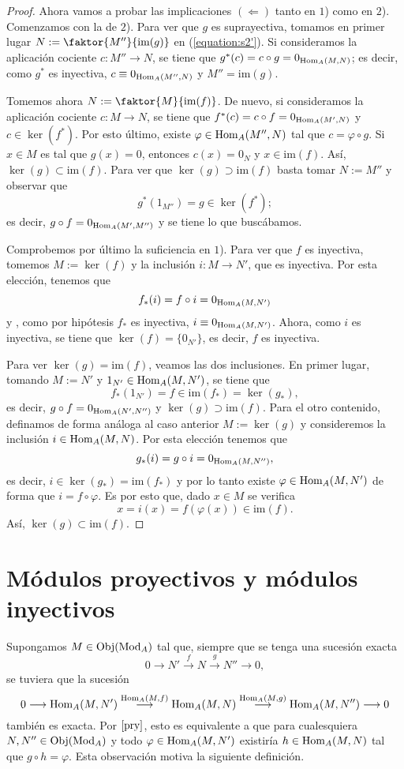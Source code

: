 \documentclass[../main.tex]{subfiles}
\begin{document}
\begin{proof}
Ahora vamos a probar las implicaciones $(\Leftarrow)$ tanto en $1$) como en $2$). Comenzamos con la de $2$). Para ver que $g$ es suprayectiva, tomamos en primer lugar $N:=\faktor{M''}{\text{im}(g)}$ en (\ref{equation:s2'}). Si consideramos la aplicación cociente $c:M''\longrightarrow N$, se tiene que $g^*(c)=c\circ g=0_{\text{Hom}_A(M,N)}$; es decir, como $g^*$ es inyectiva, $c\equiv 0_{\text{Hom}_A(M'',N)}$ y $M''=\text{im}(g)$.

Tomemos ahora $N:=\faktor{M}{\text{im}(f)}$. De nuevo, si consideramos la aplicación cociente $c:M\longrightarrow N$, se tiene que $f^*(c)=c\circ f=0_{\text{Hom}_A(M',N)}$ y $c\in\ker(f^*)$. Por esto último, existe $\varphi\in\text{Hom}_A(M'',N)$ tal que $c=\varphi\circ g$. Si $x\in M$ es tal que $g(x)=0$, entonces $c(x)=0_N$ y $x\in\text{im}(f)$. Así, $\ker(g)\subset\text{im}(f)$. Para ver que $\ker(g)\supset\text{im}(f)$ basta tomar $N:=M''$ y observar que $$g^*(1_{M''})=g\in\ker(f^*);$$ es decir, $g\circ f=0_{\text{Hom}_A(M',M'')}$ y se tiene lo que buscábamos.

Comprobemos por último la suficiencia en $1$). Para ver que $f$ es inyectiva, tomemos $M:=\ker(f)$ y la inclusión $i:M\longrightarrow N'$, que es inyectiva. Por esta elección, tenemos que
$$f_*(i)=f\circ i=0_{\text{Hom}_A(M,N')}$$
y , como por hipótesis $f_*$ es inyectiva, $i\equiv 0_{\text{Hom}_A(M,N')}$. Ahora, como $i$ es inyectiva, se tiene que $\ker(f)=\{0_{N'}\}$, es decir, $f$ es inyectiva.

Para ver $\ker(g)=\text{im}(f)$, veamos las dos inclusiones. En primer lugar, tomando $M:=N'$ y $1_{N'}\in\text{Hom}_A(M,N')$, se tiene que
$$f_*(1_{N'})=f\in\text{im}(f_*)=\ker(g_*),$$
es decir, $g\circ f=0_{\text{Hom}_A(N',N'')}$ y $\ker(g)\supset\text{im}(f)$. Para el otro contenido, definamos de forma análoga al caso anterior $M:=\ker(g)$ y consideremos la inclusión $i\in\text{Hom}_A(M,N)$. Por esta elección tenemos que
$$g_*(i)=g\circ i=0_{\text{Hom}_A(M,N'')},$$
es decir, $i\in\ker(g_*)=\text{im}(f_*)$ y por lo tanto existe $\varphi\in\text{Hom}_A(M,N')$ de forma que $i=f\circ\varphi$. Es por esto que, dado $x\in M$ se verifica
$$x=i(x)=f(\varphi(x))\in\text{im}(f).$$
Así, $\ker(g)\subset\text{im}(f)$.
\end{proof}

\section{Módulos proyectivos y módulos inyectivos}
Supongamos $M\in\text{Obj}(\text{Mod}_A)$ tal que, siempre que se tenga una sucesión exacta
$$0\longrightarrow N'\overset{f}{\longrightarrow}N\overset{g}{\longrightarrow}N''\longrightarrow 0,$$
se tuviera que la sucesión
$$0\longrightarrow \text{Hom}_A(M,N')\overset{\text{Hom}_A(M,f)}{\longrightarrow}\text{Hom}_A(M,N)\overset{\text{Hom}_A(M,g)}{\longrightarrow}\text{Hom}_A(M,N'')\longrightarrow0$$
también es exacta. Por $\ref{pry}$, esto es equivalente a que para cualesquiera $N,N''\in\text{Obj}(\text{Mod}_A)$ y todo $\varphi\in\text{Hom}_A(M,N')$ existiría $h\in\text{Hom}_A(M,N)$ tal que $g\circ h=\varphi$. Esta observación motiva la siguiente definición.
\end{document}
